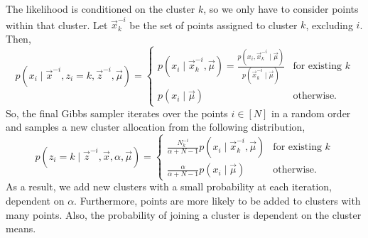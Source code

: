 The likelihood is conditioned on the cluster $k$, so we only have to consider points within that
cluster. Let $\vec{x}^{-i}_{k}$ be the set of points assigned to cluster $k$, excluding $i$. Then, \[
    p(x_i \mid \vec{x}^{-i}, z_i = k, \vec{z}^{-i}, \vec{\mu}) = \begin{cases}
        p(x_i \mid \vec{x}^{-i}_k, \vec{\mu}) = \frac{p(x_i, \vec{x}^{-i}_{k} \mid \vec{\mu})}{p(\vec{x}^{-i}_k \mid \vec{\mu})} & \text{for existing $k$} \\
        p(x_i \mid \vec{\mu})                                                                                                    & \text{otherwise}.
    \end{cases}
\]
So, the final Gibbs sampler iterates over the points $i \in [N]$ in a random order and samples a
new cluster allocation from the following distribution, \[
    p(z_i = k \mid \vec{z}^{-i}, \vec{x}, \alpha, \vec{\mu}) = \begin{cases}
        \frac{N^{-i}_k}{\alpha + N - 1} p(x_i \mid \vec{x}^{-i}_k, \vec{\mu}) & \text{for existing $k$} \\
        \frac{\alpha}{\alpha + N - 1} p(x_i \mid \vec{\mu})                   & \text{otherwise}.
    \end{cases}
\]
As a result, we add new clusters with a small probability at each iteration, dependent on $\alpha$.
Furthermore, points are more likely to be added to clusters with many points. Also, the probability
of joining a cluster is dependent on the cluster means.
